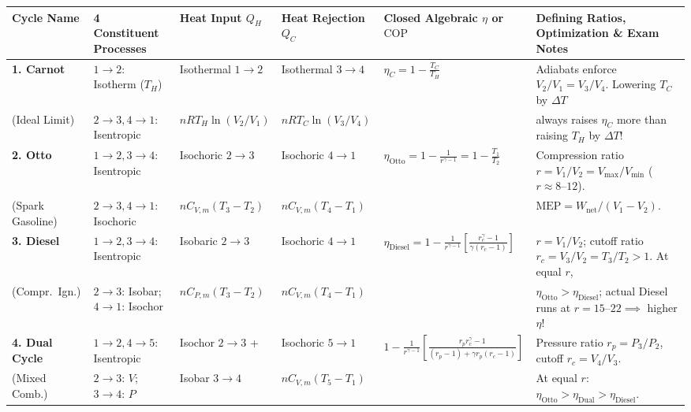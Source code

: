 \documentclass[10pt,twoside,openany,letterpaper]{book}
\begin{document}
\begin{quicksheet}
\begin{formulacard}
\par\smallskip\noindent
\scriptsize\setlength{\tabcolsep}{2.4pt}\renewcommand{\arraystretch}{1.18}
\begin{tabularx}{\linewidth}{@{}l l l l l X@{}}
\toprule
\textbf{Cycle Name} & \textbf{4 Constituent Processes} & \textbf{Heat Input $Q_H$} & \textbf{Heat Rejection $Q_C$} & \textbf{Closed Algebraic $\eta$ or $\mathrm{COP}$} & \textbf{Defining Ratios, Optimization \& Exam Notes} \\
\midrule
\textbf{1. Carnot} & $1\to 2$: Isotherm ($T_H$) & Isothermal $1\to 2$ & Isothermal $3\to 4$ & $\displaystyle \eta_C = 1 - \frac{T_C}{T_H}$ & Adiabats enforce $V_2/V_1 = V_3/V_4$. Lowering $T_C$ by $\Delta T$ \\
(Ideal Limit) & $2\to 3, 4\to 1$: Isentropic & $nRT_H\ln(V_2/V_1)$ & $nRT_C\ln(V_3/V_4)$ & & always raises $\eta_C$ more than raising $T_H$ by $\Delta T$! \\[3pt]
\textbf{2. Otto} & $1\to 2, 3\to 4$: Isentropic & Isochoric $2\to 3$ & Isochoric $4\to 1$ & $\displaystyle \eta_{\mathrm{Otto}} = 1 - \frac{1}{r^{\gamma - 1}} = 1 - \frac{T_1}{T_2}$ & Compression ratio $r = V_1/V_2 = V_{\max}/V_{\min}$ ($r \approx 8\text{--}12$). \\
(Spark Gasoline) & $2\to 3, 4\to 1$: Isochoric & $nC_{V,m}(T_3 - T_2)$ & $nC_{V,m}(T_4 - T_1)$ & & $\mathrm{MEP} = W_{\mathrm{net}}/(V_1 - V_2)$. \\[3pt]
\textbf{3. Diesel} & $1\to 2, 3\to 4$: Isentropic & Isobaric $2\to 3$ & Isochoric $4\to 1$ & $\displaystyle \eta_{\mathrm{Diesel}} = 1 - \frac{1}{r^{\gamma - 1}}\left[\frac{r_c^\gamma - 1}{\gamma(r_c - 1)}\right]$ & $r = V_1/V_2$; cutoff ratio $r_c = V_3/V_2 = T_3/T_2 > 1$. At equal $r$, \\
(Compr.\ Ign.) & $2\to 3$: Isobar; $4\to 1$: Isochor & $nC_{P,m}(T_3 - T_2)$ & $nC_{V,m}(T_4 - T_1)$ & & $\eta_{\mathrm{Otto}} > \eta_{\mathrm{Diesel}}$; actual Diesel runs at $r=15\text{--}22 \implies$ higher $\eta$! \\[3pt]
\textbf{4. Dual Cycle} & $1\to 2, 4\to 5$: Isentropic & Isochor $2\to 3$ + & Isochoric $5\to 1$ & $\displaystyle 1 - \frac{1}{r^{\gamma-1}}\left[\frac{r_p r_c^\gamma - 1}{(r_p-1)+\gamma r_p(r_c-1)}\right]$ & Pressure ratio $r_p = P_3/P_2$, cutoff $r_c = V_4/V_3$. \\
(Mixed Comb.) & $2\to 3$: $V$; $3\to 4$: $P$ & Isobar $3\to 4$ & $nC_{V,m}(T_5 - T_1)$ & & At equal $r$: $\eta_{\mathrm{Otto}} > \eta_{\mathrm{Dual}} > \eta_{\mathrm{Diesel}}$. \\[3pt]

\end{tabularx}
\end{formulacard}
\end{quicksheet}
\end{document}
